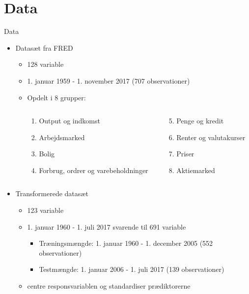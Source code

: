 \section{Data}
\begin{frame}{Data}
\begin{itemize}
\item Datasæt fra FRED
\begin{itemize}
\item 128 variable
\item 1. januar 1959 - 1. november 2017 (707 observationer)
\item Opdelt i 8 grupper:
\begin{columns}
\begin{column}{0.38\textwidth}
    \begin{enumerate}
	\item Output og indkomst
	\item Arbejdsmarked
	\item Bolig
	\item Forbrug, ordrer og varebeholdninger
\end{enumerate}
\end{column}
\begin{column}{0.38\textwidth} 
    \begin{enumerate}
    \setcounter{enumi}{4}
	\item Penge og kredit
	\item Renter og valutakurser
	\item Priser
	\item Aktiemarked
\end{enumerate}
\end{column}
\end{columns}
\end{itemize}

\item Transformerede datasæt
\begin{itemize}
\item 123 variable
\item 1. januar 1960 - 1. juli 2017 svarende til 691 variable
\begin{itemize}
\item Træningsmængde: 1. januar 1960 - 1. december 2005 (552 observationer)
\item Testmængde: 1. januar 2006 - 1. juli 2017 (139 observationer)
\end{itemize}
\item centre responsvariablen og standardiser prædiktorerne
\end{itemize}
\end{itemize}
\end{frame}


